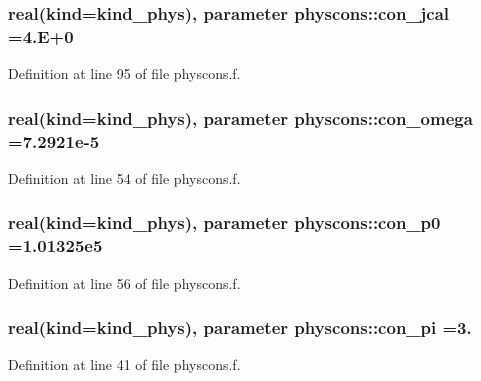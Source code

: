 \subsubsection[{\texorpdfstring{con\+\_\+jcal}{con_jcal}}]{\setlength{\rightskip}{0pt plus 5cm}real(kind=kind\+\_\+phys), parameter physcons\+::con\+\_\+jcal =4.\+E+0}\hypertarget{namespacephyscons_a28944c87d997bef79b77dc66847ff041}{}\label{namespacephyscons_a28944c87d997bef79b77dc66847ff041}


Definition at line 95 of file physcons.\+f.

\subsubsection[{\texorpdfstring{con\+\_\+omega}{con_omega}}]{\setlength{\rightskip}{0pt plus 5cm}real(kind=kind\+\_\+phys), parameter physcons\+::con\+\_\+omega =7.\+2921e-\/5}\hypertarget{namespacephyscons_a697e780a35d1cc1b3d5144b7c8019d62}{}\label{namespacephyscons_a697e780a35d1cc1b3d5144b7c8019d62}


Definition at line 54 of file physcons.\+f.

\subsubsection[{\texorpdfstring{con\+\_\+p0}{con_p0}}]{\setlength{\rightskip}{0pt plus 5cm}real(kind=kind\+\_\+phys), parameter physcons\+::con\+\_\+p0 =1.\+01325e5}\hypertarget{namespacephyscons_a9d081f8ee3735aea4c64b2c8eb5486b8}{}\label{namespacephyscons_a9d081f8ee3735aea4c64b2c8eb5486b8}


Definition at line 56 of file physcons.\+f.

\subsubsection[{\texorpdfstring{con\+\_\+pi}{con_pi}}]{\setlength{\rightskip}{0pt plus 5cm}real(kind=kind\+\_\+phys), parameter physcons\+::con\+\_\+pi =3.}\hypertarget{namespacephyscons_aeb280391512de20933b4af3593a8ba38}{}\label{namespacephyscons_aeb280391512de20933b4af3593a8ba38}


Definition at line 41 of file physcons.\+f.



